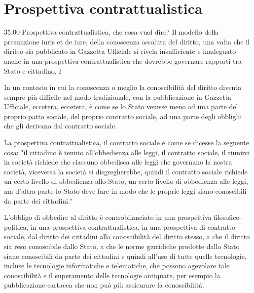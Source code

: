 \section{Prospettiva contrattualistica} 35.00
Prospettiva contrattualistica, che cosa vuol dire? Il modello della presunzione iuris et de iure, della conoscenza assoluta del diritto, una volta che il diritto sia pubblicato in Gazzetta Ufficiale si rivela insufficiente e inadeguato anche in una prospettiva contrattualistica che dovrebbe governare rapporti tra Stato e cittadino. I\par
In un contesto in cui la conoscenza o meglio la conoscibilità del diritto diventa sempre più difficile nel modo tradizionale, con la pubblicazione in Gazzetta Ufficiale, eccetera, eccetera, è come se lo Stato venisse meno ad una parte del proprio patto sociale, del proprio contratto sociale, ad una parte degli obblighi che gli derivano dal contratto sociale. \par
La prospettiva contrattualistica, il contratto sociale è come se dicesse la seguente cosa: "il cittadino è tenuto all'obbedienza alle leggi, il contratto sociale, il riunirci in società richiede che ciascuno obbedisca alle leggi che governano la nostra società, viceversa la società si disgregherebbe, quindi il contratto sociale richiede un certo livello di obbedienza allo Stato, un certo livello di obbedienza alle leggi, ma d'altra parte lo Stato deve fare in modo che le proprie leggi siano conoscibili da parte dei cittadini."\par 
L'obbligo di obbedire al diritto è controbilanciato in una prospettiva filosofico-politica, in una prospettiva contrattualistica, in una prospettiva di contratto sociale, dal diritto dei cittadini alla conoscibilità del diritto stesso, a che il diritto sia reso conoscibile dallo Stato, a che le norme giuridiche prodotte dallo Stato siano conoscibili da parte dei cittadini e quindi all'uso di tutte quelle tecnologie, incluse le tecnologie informatiche e telematiche, che possono agevolare tale conoscibilità e il superamento delle tecnologie antiquate, per esempio la pubblicazione cartacea che non può più assicurare la conoscibilità.

